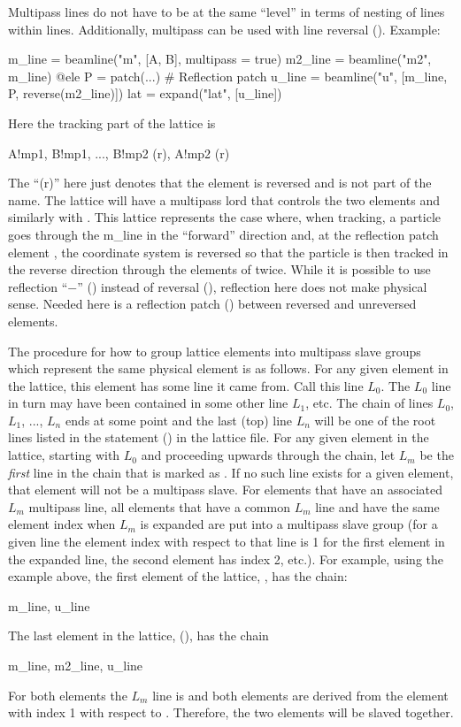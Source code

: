 Multipass lines do not have to be at the same ``level'' in terms of nesting of lines within
lines. Additionally, multipass can be used with line reversal (). Example:
\begin{example}
  m_line = beamline("m", [A, B], multipass = true)
  m2_line = beamline("m2", m_line)
  @ele P = patch(...)  # Reflection patch
  u_line = beamline("u", [m_line, P, reverse(m2_line)])
  lat = expand("lat", [u_line])
\end{example}
Here the tracking part of the lattice is
\begin{example}
  A!mp1, B!mp1, ..., B!mp2 (r), A!mp2 (r)
\end{example}
The ``(r)'' here just denotes that the element is reversed and is not part of the name. The lattice
will have a multipass lord  that controls the two  elements and similarly with
. This lattice represents the case where, when tracking, 
a particle goes through the m_line in the ``forward''
direction and, at the reflection patch element , the coordinate system is reversed so that the particle
is then tracked in the reverse direction through the elements of  twice.
While it is possible to use reflection ``$-$'' () instead
of reversal (), reflection here does not make physical sense.  Needed
here is a reflection patch  () between reversed and unreversed elements.

The procedure for how to group lattice elements into multipass slave groups which represent the same
physical element is as follows. For any given element in the lattice, this element has some line it
came from. Call this line $L_0$. The $L_0$ line in turn may have been contained in some other line
$L_1$, etc. The chain of lines $L_0$, $L_1$, ..., $L_n$ ends at some point and the last (top) line
$L_n$ will be one of the root lines listed in the  statement () in the lattice
file. For any given element in the lattice, starting with $L_0$ and proceeding upwards through the
chain, let $L_m$ be the {\em first} line in the chain that is marked as . If no such
line exists for a given element, that element will not be a multipass slave. For elements that have
an associated $L_m$ multipass line, all elements that have a common $L_m$ line and have the same
element index when $L_m$ is expanded are put into a multipass slave group (for a given line the
element index with respect to that line is 1 for the first element in the expanded line, the second
element has index 2, etc.).  For example, using the example above, the first element of the lattice,
, has the chain:
\begin{example}
    m_line, u_line
\end{example} 
The last element in the lattice, (), has the chain
\begin{example}
  m_line, m2_line, u_line
\end{example}
For both elements the $L_m$ line is  and both elements are derived from the element with
index 1 with respect to . Therefore, the two elements will be slaved together.


